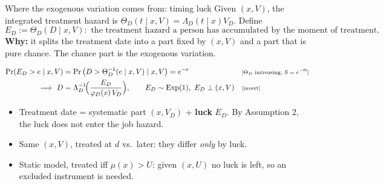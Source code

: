 \documentclass[aspectratio=169,10pt]{beamer}
\newcommand{\why}[1]{\text{\scriptsize[#1]}}
\begin{document}
\begin{frame}[label=m-luck]{Where the exogenous variation comes from: timing luck}
  \small
  Given $(x,V)$, the integrated treatment hazard is $\Theta_D(t\mid x,V)=\Lambda_D(t\mid x)V_D$. Define
  \[ E_D:=\Theta_D(D\mid x,V): \text{ the treatment hazard a person has accumulated by the moment of treatment.} \]
  \textbf{Why:} it splits the treatment date into a part fixed by $(x,V)$ and a part that is pure chance. The chance part is the exogenous variation.

  \begin{align*}
    \Pr(E_D>e\mid x,V) &= \Pr\big(D>\Theta_D^{-1}(e\mid x,V)\mid x,V\big) = e^{-e} && \why{$\Theta_D$ increasing; $S=e^{-\Theta}$} \\
    \Longrightarrow\ D &= \Lambda_D^{-1}\!\Big(\frac{E_D}{\varphi_D(x)\,V_D}\Big),\qquad E_D\sim\text{Exp}(1),\ E_D\perp(x,V) && \why{invert}
  \end{align*}
  \begin{itemize}
    \item Treatment date = systematic part $(x,V_D)$ + \textbf{luck} $E_D$. By Assumption 2, the luck does not enter the job hazard.
    \item Same $(x,V)$, treated at $d$ vs.\ later: they differ \emph{only} by luck.
    \item Static model, treated iff $\mu(x)>U$: given $(x,U)$ no luck is left, so an excluded instrument is needed.
  \end{itemize}
  \vfill\hfill\hyperlink{p-treat}{}
\end{frame}
\end{document}

